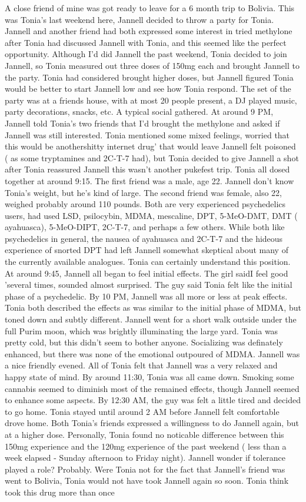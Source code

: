 \documentclass[12pt]{book}
\begin{document}
A close friend of mine was got ready to leave for a 6 month trip to Bolivia. This was Tonia's last weekend here, Jannell decided to throw a party for Tonia. Jannell and another friend had both expressed some interest in tried methylone after Tonia had discussed Jannell with Tonia, and this seemed like the perfect opportunity. Although I'd did Jannell the past weekend, Tonia decided to join Jannell, so Tonia measured out three doses of 150mg each and brought Jannell to the party. Tonia had considered brought higher doses, but Jannell figured Tonia would be better to start Jannell low and see how Tonia respond. The set of the party was at a friends house, with at most 20 people present, a DJ played music, party decorations, snacks, etc. A typical social gathered. At around 9 PM, Jannell told Tonia's two friends that I'd brought the methylone and asked if Jannell was still interested. Tonia mentioned some mixed feelings, worried that this would be anothershitty internet drug' that would leave Jannell felt poisoned ( as some tryptamines and 2C-T-7 had), but Tonia decided to give Jannell a shot after Tonia reassured Jannell this wasn't another pukefest trip. Tonia all dosed together at around 9:15. The first friend was a male, age 22. Jannell don't know Tonia's weight, but he's kind of large. The second friend was female, also 22, weighed probably around 110 pounds. Both are very experienced psychedelics users, had used LSD, psilocybin, MDMA, mescaline, DPT, 5-MeO-DMT, DMT ( ayahuasca), 5-MeO-DIPT, 2C-T-7, and perhaps a few others. While both like psychedelics in general, the nausea of ayahuasca and 2C-T-7 and the hideous experience of snorted DPT had left Jannell somewhat skeptical about many of the currently available analogues. Tonia can certainly understand this position. At around 9:45, Jannell all began to feel initial effects. The girl saidI feel good 'several times, sounded almost surprised. The guy said Tonia felt like the initial phase of a psychedelic. By 10 PM, Jannell was all more or less at peak effects. Tonia both described the effects as was similar to the initial phase of MDMA, but toned down and subtly different. Jannell went for a short walk outside under the full Purim moon, which was brightly illuminating the large yard. Tonia was pretty cold, but this didn't seem to bother anyone. Socializing was definately enhanced, but there was none of the emotional outpoured of MDMA. Jannell was a nice friendly evened. All of Tonia felt that Jannell was a very relaxed and happy state of mind. By around 11:30, Tonia was all came down. Smoking some cannabis seemed to diminish most of the remained effects, though Jannell seemed to enhance some aspects. By 12:30 AM, the guy was felt a little tired and decided to go home. Tonia stayed until around 2 AM before Jannell felt comfortable drove home. Both Tonia's friends expressed a willingness to do Jannell again, but at a higher dose. Personally, Tonia found no noticable difference between this 150mg experience and the 120mg experience of the past weekend ( less than a week elapsed - Sunday afternoon to Friday night). Jannell wonder if tolerance played a role? Probably. Were Tonia not for the fact that Jannell's friend was went to Bolivia, Tonia would not have took Jannell again so soon. Tonia think took this drug more than once 
\end{document}
